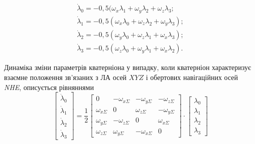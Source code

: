 \[\begin{array}{l} 
{\dot{\lambda}_{0} =-0,5(\omega_{x} \lambda_{1} +\omega_{y} \lambda_{2} +\omega_{z} \lambda_{3} ;} \\ 
{\dot{\lambda}_{1} =-0,5(\omega_{x} \lambda_{0} +\omega_{z} \lambda_{2} +\omega_{y} \lambda_{3});} \\ 
{\dot{\lambda}_{2} =-0,5(\omega_{y} \lambda_{0} +\omega_{z} \lambda_{1} +\omega_{x} \lambda_{3});} \\ 
{\dot{\lambda}_{3} =-0,5(\omega_{z} \lambda_{0} +\omega_{y} \lambda_{1} +\omega_{x} \lambda_{2}).}
\end{array}\] 

Динаміка зміни параметрів кватерніона у випадку, коли кватерніон характеризує взаємне 
положення зв'язаних з ЛА осей $XYZ$ і обертових навігаційних осей \textit{NHE}, описується 
рівняннями
\begin{equation}
 \left[\begin{array}{c} 
{\dot{\lambda }_{0}} \\ 
{\dot{\lambda }_{1}} \\ 
{\dot{\lambda }_{2}} \\ 
{\dot{\lambda }_{3}} 
\end{array}\right]=\frac{1}{2} \left[\begin{array}{cccc}
{0} & {-\omega_{x\Sigma }} & {-\omega_{y\Sigma }} & {-\omega_{z\Sigma }} \\ 
{\omega_{x\Sigma }} & {0} & {\omega_{z\Sigma }} & {-\omega_{y\Sigma }} \\ 
{\omega_{y\Sigma }} & {-\omega_{z\Sigma }} & {0} & {\omega_{x\Sigma }} \\ 
{\omega_{z\Sigma }} & {\omega_{y\Sigma }} & {-\omega_{x\Sigma }} & {0} 
\end{array}
\right]\cdot 
\left[\begin{array}{c} 
{\lambda_{0}} \\ {\lambda_{1}} \\ {\lambda_{2}} \\ {\lambda_{3}} 
\end{array}\right] 
\label{eq:qdiff}
\end{equation}

